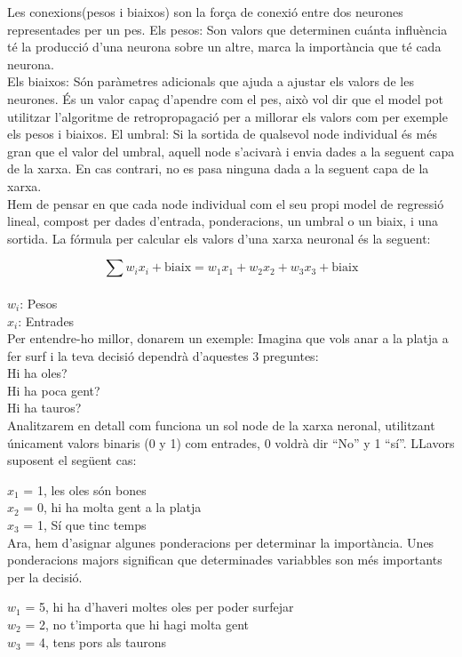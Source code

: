 Les conexions(pesos i biaixos) son la força de conexió entre dos neurones representades per un pes.
Els pesos: Son valors que determinen cuánta influència té la producció d'una neurona sobre un altre, marca la importància que té cada neurona.\\
Els biaixos: Són paràmetres adicionals que ajuda a ajustar els valors de les neurones. És un valor capaç d'apendre com el pes, això vol dir que el model pot utilitzar l'algoritme de retropropagació per a millorar els valors com per exemple els pesos i biaixos.
El umbral: Si la sortida de qualsevol node individual és més gran que el valor del umbral, aquell node s'acivarà i envia dades a la seguent capa de la xarxa. En cas contrari, no es pasa ninguna dada a la seguent capa de la xarxa.\\

Hem de pensar en que cada node individual com el seu propi model de regressió lineal, compost per dades d'entrada, ponderacions, un umbral o un biaix, i una sortida. La fórmula per calcular els valors d'una xarxa neuronal és la seguent:

\[
\sum w_i x_i + \text{biaix} = w_1 x_1 + w_2 x_2 + w_3 x_3 + \text{biaix}
\] \\

$w_i$: Pesos\\
$x_i$: Entrades\\


Per entendre-ho millor, donarem un exemple: Imagina que vols anar a la platja a fer surf i la teva decisió dependrà d'aquestes 3 preguntes:\\

Hi ha oles?\\
Hi ha poca gent?\\
Hi ha tauros?\\

Analitzarem en detall com funciona un sol node de la xarxa neronal, utilitzant únicament valors binaris (0 y 1) com entrades, 0 voldrà dir ``No'' y 1 ``sí''.
LLavors suposent el següent cas:

$x_1$ = 1, les oles són bones\\
$x_2$ = 0, hi ha molta gent a la platja\\
$x_3$ = 1, Sí que tinc temps\\

Ara, hem d'asignar algunes ponderacions per determinar la importància. Unes ponderacions majors significan que determinades variabbles son més importants per la decisió.

$w_1$ = 5, hi ha d'haveri moltes oles per poder surfejar\\
$w_2$ = 2, no t'importa que hi hagi molta gent\\
$w_3$ = 4, tens pors als taurons \\

